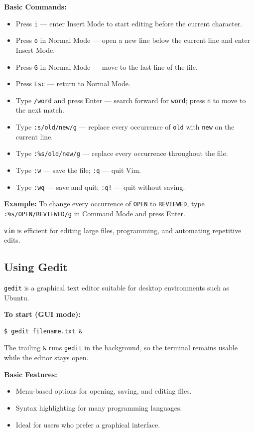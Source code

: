 \textbf{Basic Commands:}
\begin{itemize}
    \item Press \texttt{i} --- enter Insert Mode to start editing before the current character.
    \item Press \texttt{o} in Normal Mode --- open a new line below the current line and enter Insert Mode.
    \item Press \texttt{G} in Normal Mode --- move to the last line of the file.
    \item Press \texttt{Esc} --- return to Normal Mode.
    \item Type \texttt{/word} and press Enter --- search forward for \texttt{word}; press \texttt{n} to move to the next match.
    \item Type \texttt{:s/old/new/g} --- replace every occurrence of \texttt{old} with \texttt{new} on the current line.
    \item Type \texttt{:\%s/old/new/g} --- replace every occurrence throughout the file.
    \item Type \texttt{:w} --- save the file; \texttt{:q} --- quit Vim.
    \item Type \texttt{:wq} --- save and quit; \texttt{:q!} --- quit without saving.
\end{itemize}
\textbf{Example:} To change every occurrence of \texttt{OPEN} to \texttt{REVIEWED}, type \texttt{:\%s/OPEN/REVIEWED/g} in Command Mode and press Enter.

\texttt{vim} is efficient for editing large files, programming, and automating repetitive edits.

\subsection{Using Gedit}
\texttt{gedit} is a graphical text editor suitable for desktop environments such as Ubuntu.

\textbf{To start (GUI mode):}
\begin{lstlisting}[language=Terminal]
$ gedit filename.txt &
\end{lstlisting}
The trailing \texttt{\&} runs \texttt{gedit} in the background, so the terminal remains usable while the editor stays open.

\textbf{Basic Features:}
\begin{itemize}
    \item Menu-based options for opening, saving, and editing files.
    \item Syntax highlighting for many programming languages.
    \item Ideal for users who prefer a graphical interface.
\end{itemize}


